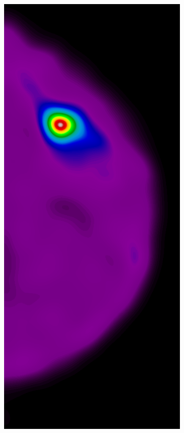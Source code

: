 \documentclass{beamer}
\begin{document}
\begin{frame}
\begin{figure}
\begin{subfigure}{0.134\textwidth}
            \end{subfigure}
            \begin{subfigure}{0.134\textwidth}
	            \centering
		            \includegraphics[width=\textwidth]{plots/examples/example2_probs_1_1.png}

\end{subfigure}
\end{figure}
\end{frame}
\end{document}

